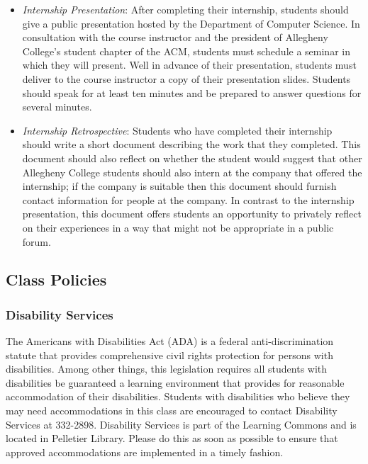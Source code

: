 \begin{itemize}
	\item {\em Internship Presentation}: After completing their internship, students should give a public presentation
		hosted by the Department of Computer Science. In consultation with the course instructor and the president of
		Allegheny College's student chapter of the ACM, students must schedule a seminar in which they will
		present.  Well in advance of their presentation, students must deliver to the course instructor a copy of their 
		presentation slides.  Students should speak for at least ten minutes and be prepared to answer questions for
		several minutes.     

	\item {\em Internship Retrospective}: Students who have completed their internship should write a short document
		describing the work that they completed.  This document should also reflect on whether the student would suggest
		that other Allegheny College students should also intern at the company that offered the internship;  if the
		company is suitable then this document should furnish contact information for people at the company.  In
		contrast to the internship presentation, this document offers students an opportunity to privately reflect on
		their experiences in a way that might not be appropriate in a public forum.

\end{itemize}

\subsection*{Class Policies}

\subsubsection*{Disability Services}

The Americans with Disabilities Act (ADA) is a federal anti-discrimination statute that provides comprehensive civil
rights protection for persons with disabilities.  Among other things, this legislation requires all students with
disabilities be guaranteed a learning environment that provides for reasonable accommodation of their disabilities.
Students with disabilities who believe they may need accommodations in this class are encouraged to contact Disability
Services at 332-2898.  Disability Services is part of the Learning Commons and is located in Pelletier Library.
Please do this as soon as possible to ensure that approved accommodations are implemented in a timely fashion.

